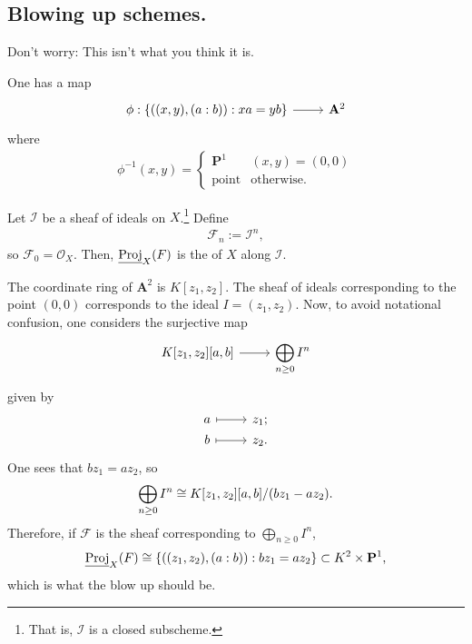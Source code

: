 \documentclass [11 pt, oneside] {article}
\begin{document}
\subsection{Blowing up schemes.}
Don't worry: This isn't what you think it is.

\begin{example}\label{backtothis_{08}2}\text{}
One has a map
\[
\begin{tikzcd}
	\phi:\left\{ ((x,y), (a:b)) : xa=yb \right\} \ar[r]&\mathbf{A}^2
\end{tikzcd}
\]
where
\begin{align*}
	\phi^{-1}(x,y) = 
	 \begin{cases}
		 \mathbf{P}^1 & (x,y) =(0,0)\\
		 \textrm{point} &\textrm{otherwise.}
	\end{cases}
\end{align*}
\end{example}

Let $\mathscr{I}$ be a sheaf of ideals on $X$.\footnote{That is, $\mathscr{I}$ is a closed subscheme.} Define
\begin{align*}
	\mathscr{F}_n := \mathscr{I}^n,
\end{align*}
so $\mathscr{F}_0=\mathscr{O}_X$. Then, $\underline{\operatorname{Proj}}_X(\relax{F})$ is the  of $X$ along $\mathscr{I}$.

\begin{example}\label{}\text{}
The coordinate ring of $\mathbf{A}^2$ is $K[z_1,z_2]$.
The sheaf of ideals corresponding to the point $(0,0)$ corresponds to the ideal $I = (z_1,z_2)$.
Now, to avoid notational confusion, one considers the surjective map
\[
\begin{tikzcd}
	K[z_1,z_2][a,b] \ar[r]&\displaystyle\bigoplus_{n\ge 0}I^n
\end{tikzcd}
\]
given by
\[
\begin{tikzcd}[row sep = 0 em]
	a\ar[r,mapsto]&z_1;\\
	b\ar[r,mapsto]&z_2.
\end{tikzcd}
\]
One sees that $bz_1=az_2$, so
\begin{align*}
	\bigoplus_{n\ge 0}I^n\cong K[z_1,z_2][a,b]/(bz_1-az_2).
\end{align*}
Therefore, if $\mathscr{F}$ is the sheaf corresponding to $\bigoplus_{n\ge 0}I^n$,
\begin{align*}
	\underline{\operatorname{Proj}}_X(\relax{F}) \cong \left\{ ((z_1,z_2),(a:b)): bz_1=az_2 \right\}\subset K^2\times \mathbf{P}^1, 
\end{align*}
which is what the blow up should be.
\end{example}
\end{document}
